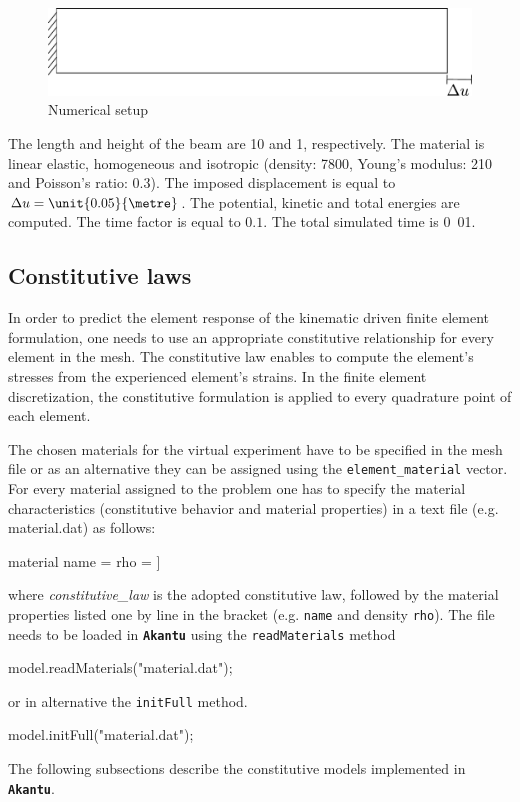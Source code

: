 \documentclass[a4paper,11pt]{book}
\newcommand{\akantu}{{\texttt{\textbf{Akantu}}}\xspace}
\newcommand{\code}[1]{\texttt{#1}}
\begin{document}
\begin{figure}[!htb]
  \centering
  \includegraphics[scale=.6]{figures/explicit_dynamic}
  \caption{Numerical setup \label{fig:smm:explicit}}
\end{figure}

The length  and height of  the beam are \unit{10}{\metre}  and \unit{1}{\metre},
respectively.   The  material  is  linear  elastic,  homogeneous  and  isotropic
(density:       \unit{7800}{\kilogrampercubicmetre},       Young's      modulus:
\unit{210}{\giga\pascal} and Poisson's  ratio: $0.3$).  The imposed displacement
is equal to  $\Delta u = \unit{0.05}{\metre}$. The  potential, kinetic and
total  energies are  computed.  The  time factor  is equal  to $0.1$.  The total
simulated time is \unit{0.01}{\second}.

\subsection{Constitutive laws}
In order to predict the element response of the kinematic driven finite element formulation, one needs to use an appropriate constitutive relationship for every element in the mesh. The constitutive law enables to compute the element's stresses from the experienced element's strains. In the finite element discretization, the constitutive formulation is applied to every quadrature point of each element.

The chosen materials for the virtual experiment have to be specified in the mesh file or as an alternative they can be assigned using the \code{element\_material} vector.
For every material assigned to the problem one has to specify the material characteristics (constitutive behavior and material properties) in a text file (e.g. material.dat) as follows:
\begin{cpp}
material %
	 name = %
	 rho = %
]

\end{cpp}
where \emph{constitutive\_law} is the adopted constitutive law, followed by the material properties listed one by line in the bracket (e.g. \code{name} and density \code{rho}). The file needs to be loaded in \akantu using the \code{readMaterials} method
\begin{cpp}
  model.readMaterials("material.dat");
\end{cpp}
or in alternative the \code{initFull} method.
\begin{cpp}
  model.initFull("material.dat");
\end{cpp}
The following subsections describe the constitutive models implemented in \akantu.
\end{document}
